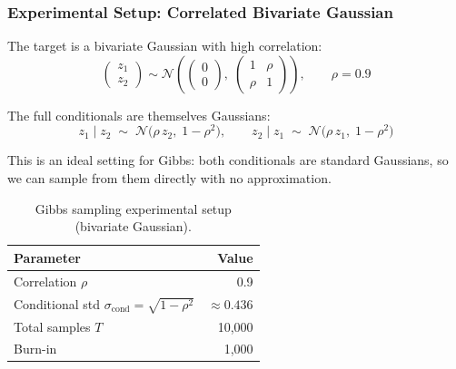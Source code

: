 \documentclass[12pt, a4paper]{article}
\begin{document}
\subsubsection{Experimental Setup: Correlated Bivariate Gaussian}

The target is a bivariate Gaussian with high correlation:
\begin{equation}
    \begin{pmatrix} z_1 \\ z_2 \end{pmatrix}
    \sim
    \mathcal{N}\!\left(
        \begin{pmatrix} 0 \\ 0 \end{pmatrix},\;
        \begin{pmatrix} 1 & \rho \\ \rho & 1 \end{pmatrix}
    \right),
    \qquad \rho = 0.9
    \label{eq:gibbs_target}
\end{equation}

The full conditionals are themselves Gaussians:
\begin{equation}
    z_1 \mid z_2 \;\sim\;
    \mathcal{N}\!\bigl(\rho\, z_2,\; 1-\rho^2\bigr),
    \qquad
    z_2 \mid z_1 \;\sim\;
    \mathcal{N}\!\bigl(\rho\, z_1,\; 1-\rho^2\bigr)
    \label{eq:gibbs_conditionals}
\end{equation}

This is an ideal setting for Gibbs: both conditionals are
standard Gaussians, so we can sample from them directly with
no approximation.

\begin{table}[H]
    \centering
    \begin{tabular}{lr}
        \toprule
        \textbf{Parameter} & \textbf{Value} \\
        \midrule
        Correlation $\rho$
            & 0.9 \\
        Conditional std $\sigma_{\text{cond}}
            = \sqrt{1-\rho^2}$
            & $\approx 0.436$ \\
        Total samples $T$
            & 10{,}000 \\
        Burn-in
            & 1{,}000 \\
        \bottomrule
    \end{tabular}
    \caption{Gibbs sampling experimental setup
             (bivariate Gaussian).}
    \label{tab:gibbs_setup}
\end{table}
\end{document}
